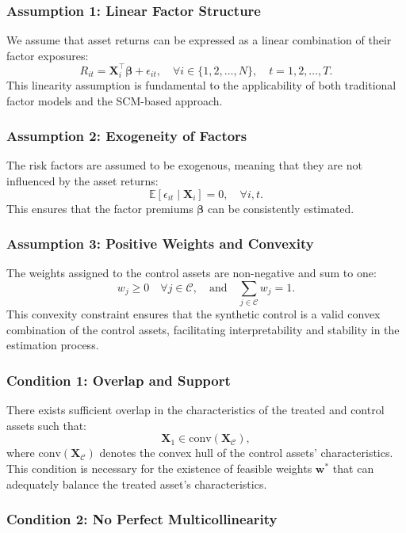 \subsubsection{Assumption 1: Linear Factor Structure}

We assume that asset returns can be expressed as a linear combination of their factor exposures:
\[
R_{it} = \mathbf{X}_i^\top \boldsymbol{\beta} + \epsilon_{it}, \quad \forall i \in \{1, 2, \dots, N\}, \quad t = 1, 2, \dots, T.
\]
This linearity assumption is fundamental to the applicability of both traditional factor models and the SCM-based approach.

\subsubsection{Assumption 2: Exogeneity of Factors}

The risk factors are assumed to be exogenous, meaning that they are not influenced by the asset returns:
\[
\mathbb{E}[\epsilon_{it} \mid \mathbf{X}_i] = 0, \quad \forall i, t.
\]
This ensures that the factor premiums $\boldsymbol{\beta}$ can be consistently estimated.

\subsubsection{Assumption 3: Positive Weights and Convexity}

The weights assigned to the control assets are non-negative and sum to one:
\[
w_j \geq 0 \quad \forall j \in \mathcal{C}, \quad \text{and} \quad \sum_{j \in \mathcal{C}} w_j = 1.
\]
This convexity constraint ensures that the synthetic control is a valid convex combination of the control assets, facilitating interpretability and stability in the estimation process.

\subsubsection{Condition 1: Overlap and Support}

There exists sufficient overlap in the characteristics of the treated and control assets such that:
\[
\mathbf{X}_1 \in \text{conv}(\mathbf{X}_{\mathcal{C}}),
\]
where $\text{conv}(\mathbf{X}_{\mathcal{C}})$ denotes the convex hull of the control assets' characteristics. This condition is necessary for the existence of feasible weights $\mathbf{w}^*$ that can adequately balance the treated asset's characteristics.

\subsubsection{Condition 2: No Perfect Multicollinearity}

